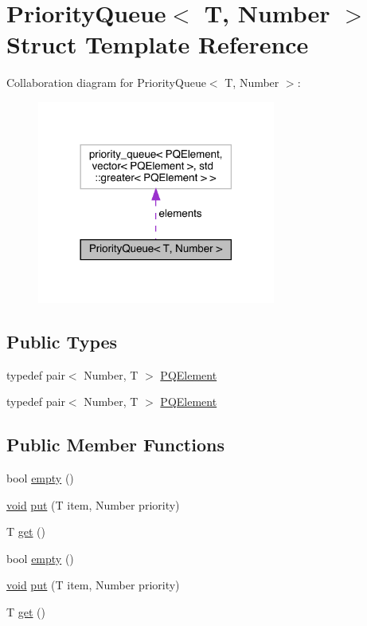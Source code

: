 \hypertarget{struct_priority_queue}{}\section{Priority\+Queue$<$ T, Number $>$ Struct Template Reference}
\label{struct_priority_queue}


Collaboration diagram for Priority\+Queue$<$ T, Number $>$\+:\nopagebreak
\begin{figure}[H]
\begin{center}
\leavevmode
\includegraphics[width=222pt]{struct_priority_queue__coll__graph}
\end{center}
\end{figure}
\subsection*{Public Types}
\begin{DoxyCompactItemize}
\item 
typedef pair$<$ Number, T $>$ \mbox{\hyperlink{struct_priority_queue_ae86a19aae3f9a32a1d76dfdab34eb70b}{P\+Q\+Element}}
\item 
typedef pair$<$ Number, T $>$ \mbox{\hyperlink{struct_priority_queue_ae86a19aae3f9a32a1d76dfdab34eb70b}{P\+Q\+Element}}
\end{DoxyCompactItemize}
\subsection*{Public Member Functions}
\begin{DoxyCompactItemize}
\item 
bool \mbox{\hyperlink{struct_priority_queue_a422e38d0c3b8398dc6e4867bb4ceec41}{empty}} ()
\item 
\mbox{\hyperlink{glad_8h_a950fc91edb4504f62f1c577bf4727c29}{void}} \mbox{\hyperlink{struct_priority_queue_a9361c94664b98a15a91a595d65c9846c}{put}} (T item, Number priority)
\item 
T \mbox{\hyperlink{struct_priority_queue_ab211c9583fda5c1a6352021444af5f0e}{get}} ()
\item 
bool \mbox{\hyperlink{struct_priority_queue_a422e38d0c3b8398dc6e4867bb4ceec41}{empty}} ()
\item 
\mbox{\hyperlink{glad_8h_a950fc91edb4504f62f1c577bf4727c29}{void}} \mbox{\hyperlink{struct_priority_queue_a9361c94664b98a15a91a595d65c9846c}{put}} (T item, Number priority)
\item 
T \mbox{\hyperlink{struct_priority_queue_ab211c9583fda5c1a6352021444af5f0e}{get}} ()
\end{DoxyCompactItemize}
